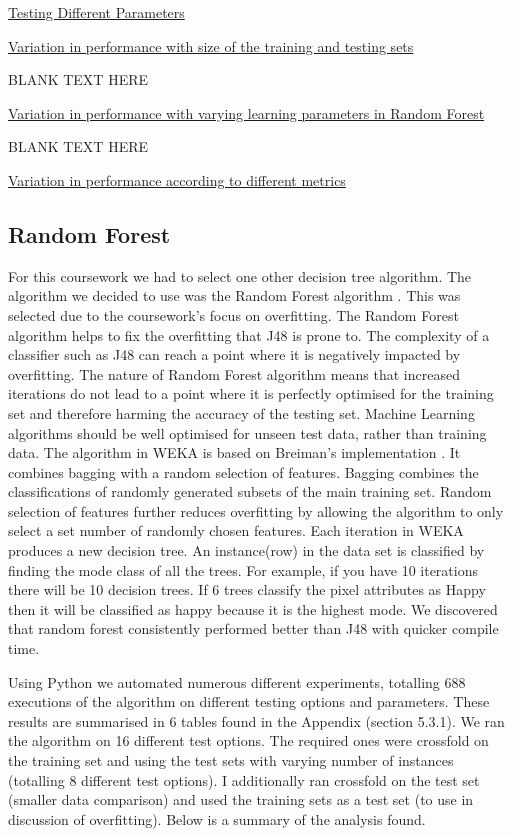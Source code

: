 \label{sec:dt:tts}
\raggedright\underline{Testing Different Parameters}


\raggedright\underline{Variation in performance with size of the training and testing sets}

BLANK TEXT HERE
\newline

\raggedright\underline{Variation in performance with varying learning parameters in Random Forest}

BLANK TEXT HERE
\newline

\raggedright\underline{Variation in performance according to different metrics}



\subsection{Random Forest}
\label{sec:dt:rf}
For this coursework we had to select one other decision tree algorithm. The algorithm we decided to use was the Random Forest algorithm \autocite{Breiman2001}. This was selected due to the coursework's focus on overfitting. The Random Forest algorithm helps to fix the overfitting that J48 is prone to. The complexity of a classifier such as J48 can reach a point where it is negatively impacted by overfitting. The nature of Random Forest algorithm means that increased iterations do not lead to a point where it is perfectly optimised for the training set and therefore harming the accuracy of the testing set. Machine Learning algorithms should be well optimised for unseen test data, rather than training data. The algorithm in WEKA is based on Breiman's implementation \autocite{Breiman2001}. It combines bagging with a random selection of features. Bagging combines the classifications of randomly generated subsets of the main training set. Random selection of features further reduces overfitting by allowing the algorithm to only select a set number of randomly chosen features. Each iteration in WEKA produces a new decision tree. An instance(row) in the data set is classified by finding the mode class of all the trees. For example, if you have 10 iterations there will be 10 decision trees. If 6 trees classify the pixel attributes as Happy then it will be classified as happy because it is the highest mode. We discovered that random forest consistently performed better than J48 with quicker compile time.

Using Python we automated numerous different experiments, totalling 688 executions of the algorithm on different testing options and parameters. These results are summarised in 6 tables found in the Appendix (section 5.3.1). We ran the algorithm on 16 different test options. The required ones were crossfold on the training set and using the test sets with varying number of instances (totalling 8 different test options). I additionally ran crossfold on the test set (smaller data comparison) and used the training sets as a test set (to use in discussion of overfitting). Below is a summary of the analysis found.  

